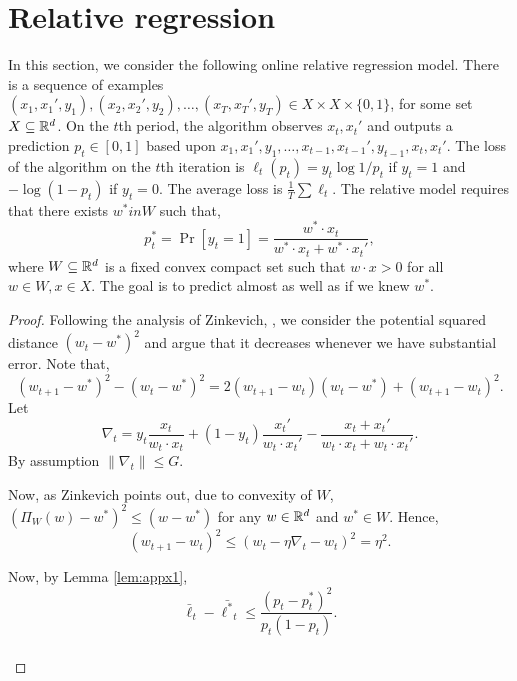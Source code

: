 \documentclass{article}
\begin{document}




\vskip 0.3in


\section{Relative regression}

In this section, we consider the following online relative regression model.  There is a sequence of examples $(x_1,x_1',y_1),(x_2,x_2',y_2),\ldots,(x_T,x_T',y_T) \in X \times X \times \{0,1\}$, for some set $X \subseteq \mathbb{R}^d$.  On the $t$th period, the algorithm observes $x_t,x_t'$ and outputs a prediction $p_t \in [0,1]$ based upon $x_1,x_1',y_1,\ldots,x_{t-1},x_{t-1}',y_{t-1},x_t,x_t'$.  The loss of the algorithm on the $t$th iteration is $\ell_t(p_t)=y_t\log 1/p_t$ if $y_t=1$ and $-\log (1-p_t)$ if $y_t=0$.  The average loss is $\frac{1}{T}\sum \ell_t$.  The relative model requires that there exists $w^* in W$ such that,
$$p^*_t =\Pr[y_t=1]=\frac{w^*\cdot x_t}{w^*\cdot x_t+w^*\cdot x_t'},$$
where $W \subseteq \mathbb{R}^d$ is a fixed convex compact set such that $w \cdot x > 0$ for all $w\in W, x\in X$.  The goal is to predict almost as well as if we knew $w^*$.

\begin{proof}
Following the analysis of Zinkevich, \cite{??}, we consider the potential squared distance $(w_t-w^*)^2$ and argue that it decreases whenever we have substantial error.  Note that,
$$(w_{t+1}-w^*)^2 - (w_t-w^*)^2 = 2(w_{t+1}-w_t)(w_t-w^*)+(w_{t+1}-w_t)^2.$$
Let $$\nabla_t = y_t \frac{x_t}{w_t\cdot x_t} + (1-y_t)\frac{x_t'}{w_t\cdot x_t'}  - \frac{x_t+x_t'}{w_t\cdot x_t+w_t\cdot x_t'}.$$
By assumption $\|\nabla_t\| \leq G$.

Now, as Zinkevich points out, due to convexity of $W$, $(\Pi_W(w)-w^*)^2\leq (w-w^*)$ for any $w \in \mathbb{R}^d$ and $w^* \in W$.  Hence,
$$(w_{t+1}-w_t)^2 \leq (w_t-\eta \nabla_t-w_t)^2=\eta^2.$$

Now, by Lemma \ref{lem:appx1},
$$\bar{\ell}_t - \bar{\ell^*}_t \leq \frac{(p_t-p^*_t)^2}{p_t(1-p_t)}.$$

\begin{align*}
\end{align*}


\end{proof}
\end{document}
